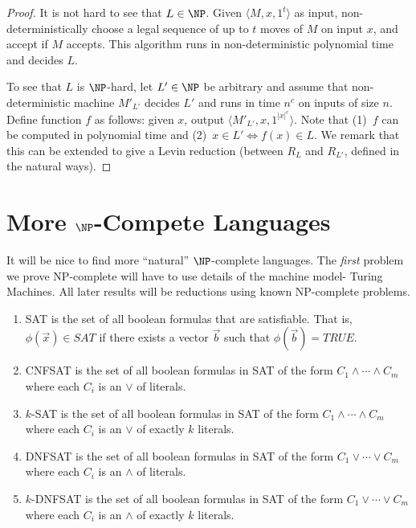 \documentclass[12pt]{article}
\begin{document}
\begin{proof}
It is not hard to see that $L \in \NP$. Given $\langle M, x, 1^t \rangle$ as input, non-deterministically choose a legal sequence of up to $t$ moves of $M$ on input $x$, and accept if $M$ accepts. This algorithm runs in non-deterministic polynomial time and decides $L$.

To see that $L$ is $\NP$-hard, let $L' \in \NP$ be arbitrary and assume that non-deterministic machine $M'_{L'}$ decides $L'$ and
runs in time $n^c$ on inputs of size $n$.
Define function $f$ as follows: given $x$, output $\langle M'_{L'}, x, 1^{|x|^c} \rangle$.
Note that (1)~$f$ can be computed in polynomial time and (2)~$x \in L' \Leftrightarrow f(x) \in L$.
We remark that this can be extended to give a Levin reduction (between $R_{L}$ and $R_{L'}$, defined in the natural ways).
\end{proof}

\section{More $\NP$-Compete Languages}
It will be nice to find more ``natural'' $\NP$-complete languages.
The \emph{first} problem we prove NP-complete will have
to use details of the machine model- Turing Machines.
All later results will be reductions using known NP-complete problems.

\begin{definition}
\begin{enumerate}
\item
SAT is the set of all boolean formulas that are satisfiable.
That is, $\phi(\vec x)\in SAT$ if there exists a vector $\vec b$
such that $\phi(\vec b)=TRUE$.
\item
CNFSAT is the set of all boolean formulas in SAT of the form
$C_1 \wedge \cdots \wedge C_m$ 
where each $C_i$ is an $\vee$ of literals.
\item
$k$-SAT is the set of all boolean formulas in SAT of the form
$C_1 \wedge \cdots \wedge C_m$ 
where each $C_i$ is an $\vee$ of exactly $k$ literals.
\item
DNFSAT is the set of all boolean formulas in SAT of the form
$C_1 \vee \cdots \vee C_m$ 
where each $C_i$ is an $\wedge$ of literals.
\item
$k$-DNFSAT is the set of all boolean formulas in SAT of the form
$C_1 \vee \cdots \vee C_m$ 
where each $C_i$ is an $\wedge$ of exactly $k$ literals.
\end{enumerate}
\end{definition}
\end{document}
